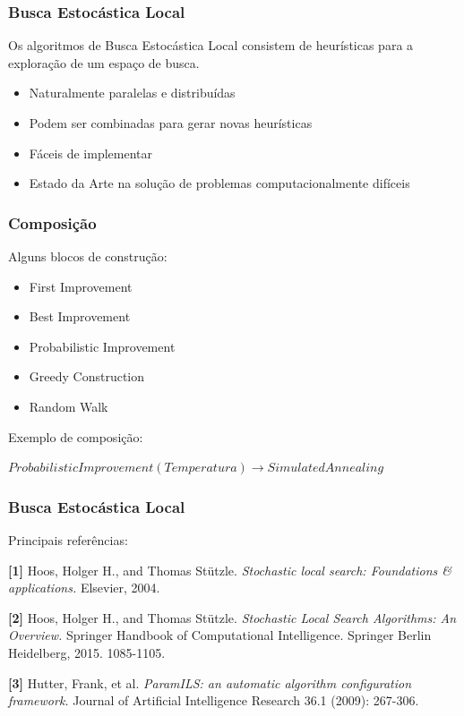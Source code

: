 \documentclass[10pt, compress]{beamer}
\begin{document}
\begin{frame}[fragile]
\begin{columns}
\begin{figure}[h]
        \end{figure}
    \end{columns}
    \let\thefootnote\relax{}
\end{frame}

\begin{frame}[fragile]
    \frametitle{Busca Estocástica Local}
    Os algoritmos de Busca Estocástica Local consistem de
    \alert{heurísticas} para a exploração de um espaço de busca.
    \begin{itemize}
        \item Naturalmente \alert{paralelas} e \alert{distribuídas}
        \item Podem ser \alert{combinadas} para gerar novas heurísticas
        \item \alert{Fáceis} de implementar
        \item \alert{Estado da Arte}\footnotemark{} na solução de problemas
            computacionalmente difíceis
    \end{itemize}
\end{frame}

\begin{frame}[fragile]
    \frametitle{Composição}
    Alguns \alert{blocos de construção}:
    \begin{itemize}
        \item First Improvement
        \item Best Improvement
        \item Probabilistic Improvement
        \item Greedy Construction
        \item Random Walk
    \end{itemize}
    Exemplo de \alert{composição}:

    $ProbabilisticImprovement(Temperatura) \rightarrow SimulatedAnnealing$
\end{frame}

\begin{frame}[fragile]
    \frametitle{Busca Estocástica Local}
    Principais referências:

    \textbf{[1]} Hoos, Holger H., and Thomas Stützle.
    \emph{Stochastic local search: Foundations \& applications.} Elsevier, 2004.

    \textbf{[2]} Hoos, Holger H., and Thomas Stützle. \emph{Stochastic Local Search Algorithms: An Overview.}
    Springer Handbook of Computational Intelligence. Springer Berlin Heidelberg, 2015. 1085-1105.

    \textbf{[3]} Hutter, Frank, et al. \emph{ParamILS: an automatic
    algorithm configuration framework.} Journal of Artificial
    Intelligence Research 36.1 (2009): 267-306.
\end{frame}
\end{document}
